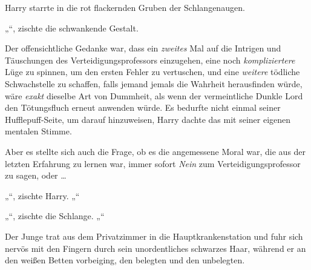 Harry starrte in die rot flackernden Gruben der Schlangenaugen.

„“, zischte die schwankende Gestalt.

Der offensichtliche Gedanke war, dass ein \emph{zweites} Mal auf die Intrigen und Täuschungen des Verteidigungsprofessors einzugehen, eine noch \emph{kompliziertere} Lüge zu spinnen, um den ersten Fehler zu vertuschen, und eine \emph{weitere} tödliche Schwachstelle zu schaffen, falls jemand jemals die Wahrheit herausfinden würde, wäre \emph{exakt} dieselbe Art von Dummheit, als wenn der vermeintliche Dunkle Lord den Tötungsfluch erneut anwenden würde. Es bedurfte nicht einmal seiner Hufflepuff-Seite, um darauf hinzuweisen, Harry dachte das mit seiner eigenen mentalen Stimme.

Aber es stellte sich auch die Frage, ob es die angemessene Moral war, die aus der letzten Erfahrung zu lernen war, immer sofort \emph{Nein} zum Verteidigungsprofessor zu sagen, oder …

„“, zischte Harry. „“

„“, zischte die Schlange. „“

\later

Der Junge trat aus dem Privatzimmer in die Hauptkrankenstation und fuhr sich nervös mit den Fingern durch sein unordentliches schwarzes Haar, während er an den weißen Betten vorbeiging, den belegten und den unbelegten.

